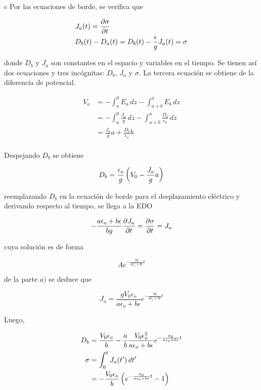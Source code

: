 \begin{solucion}{4}
\ics c
Por las ecuaciones de borde, se verifica que

\begin{equation}
\begin{split}
    &J_a(t) = \frac{\partial \sigma}{\partial t}\\
    &D_b(t) - D_a(t) = D_b(t) - \frac{\epsilon}{g}J_a(t) = \sigma\\
\end{split}
\nonumber
\end{equation}

donde $D_b$ y $J_a$ son constantes en el espacio y variables en el tiempo. Se tienen así dos ecuaciones y tres incógnitas: $D_b$, $J_a$ y $\sigma$. La tercera ecuación se obtiene de la diferencia de potencial.

\begin{equation}
\begin{split}
    V_o &= -\int^0_aE_a\,dz -\int^a_{a+b}E_b\,dz\\
    &= -\int^0_a\frac{J_a}{g}\,dz
    -\int^a_{a+b}\frac{D_b}{\epsilon_o}\,dz\\
    &= \frac{J_a}{g}a + \frac{D_b}{\epsilon_o}b\\
\end{split}
\nonumber
\end{equation}

Despejando $D_b$ se obtiene

\[D_b=\frac{\epsilon_o}{g}\lados{(}{V_0-\frac{J_a}{g}a}\]

reemplazando $D_b$ en la ecuación de borde para el desplazamiento eléctrico y derivando respecto al tiempo, se llega a la EDO

\[-\frac{a\epsilon_o+b\epsilon}{bg}\frac{\partial J_a}{\partial t}
=\frac{\partial \sigma}{\partial t}=J_a\]

cuya solución es de forma

\[Ae^{-\frac{bg}{a\epsilon_o+b\epsilon}t}\]

de la parte $a)$ se deduce que

\[J_a = \frac{gV_0\epsilon_o}{a\epsilon_o+b\epsilon}
e^{-\frac{bg}{a\epsilon_o+b\epsilon}t}\]

Luego,

\begin{equation}
\begin{split}
    D_b &= \frac{V_0\epsilon_o}{b}-
    \frac{a}{b}\frac{V_0\epsilon_o^2}{a\epsilon_o+b\epsilon}
    e^{-\frac{bg}{a\epsilon_o+b\epsilon}t}\\
    \sigma &= \int^t_0J_a(t')\,dt'\\
    &= -\frac{V_0\epsilon_o}{b}\lados{(}{e^{-\frac{bg}{a\epsilon_o+b\epsilon}t}-1}\\
\end{split}
\nonumber
\end{equation}


\end{solucion}
